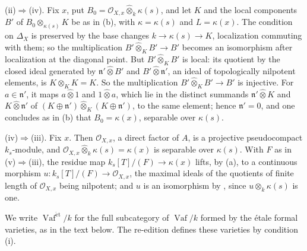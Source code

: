 \textup{(ii)}\(\Rightarrow\)\textup{(iv)}. Fix \(x\), put
\(B_0=\mathcal O_{X,x}\widehat\otimes_k\kappa(s)\), and let \(K\) and
the local components \(B'\) of \(B_0\otimes_{\kappa(s)}K\) be as in
\textup{(b)}, with \(\kappa=\kappa(s)\) and \(L=\kappa(x)\). The
condition on \(\Delta_X\) is preserved by the base changes
\(k\to\kappa(s)\to K\), localization commuting with them; so the
multiplication \(B'\widehat\otimes_KB'\to B'\) becomes an isomorphism
after localization at the diagonal point. But
\(B'\widehat\otimes_KB'\) is local: its quotient by the closed ideal
generated by \(\mathfrak n'\widehat\otimes B'\) and
\(B'\widehat\otimes\mathfrak n'\), an ideal of topologically nilpotent
elements, is \(K\otimes_KK=K\). So the multiplication
\(B'\widehat\otimes_KB'\to B'\) is injective. For
\(a\in\mathfrak n'\), it maps \(a\widehat\otimes1\) and
\(1\widehat\otimes a\), which lie in the distinct summands
\(\mathfrak n'\widehat\otimes K\) and \(K\widehat\otimes\mathfrak n'\)
of \((K\oplus\mathfrak n')\widehat\otimes_K(K\oplus\mathfrak n')\), to
the same element; hence \(\mathfrak n'=0\), and one concludes as in
\textup{(b)} that \(B_0=\kappa(x)\), separable over \(\kappa(s)\).

\textup{(iv)}\(\Rightarrow\)\textup{(iii)}. Fix \(x\). Then
\(\mathcal O_{X,x}\), a direct factor of \(A\), is a projective
pseudocompact \(k_s\)-module, and
\(\mathcal O_{X,x}\widehat\otimes_k\kappa(s)=\kappa(x)\) is separable
over \(\kappa(s)\). With \(F\) as in
\textup{(v)}\(\Rightarrow\)\textup{(iii)}, the residue map
\(k_s[T]/(F)\to\kappa(x)\) lifts, by \textup{(a)}, to a continuous
morphism \(u:k_s[T]/(F)\to\mathcal O_{X,x}\), the maximal ideals of the
quotients of finite length of \(\mathcal O_{X,x}\) being nilpotent; and
\(u\) is an isomorphism by , since \(u\widehat\otimes_k\kappa(s)\)
is one.

We write \(\operatorname{Vaf}^{\mathrm{\acute{e}t}}/k\) for the full
subcategory of \(\operatorname{Vaf}/k\) formed by the étale formal
varieties, as in the text below. The re-edition defines these varieties
by condition \textup{(i)}.
